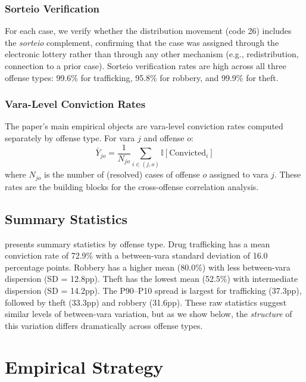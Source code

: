 \documentclass[12pt]{article}
\newcommand{\ind}{\mathbb{I}}
\begin{document}
\subsubsection*{Sorteio Verification} For each case, we verify whether the distribution movement (code 26) includes the \textit{sorteio} complement, confirming that the case was assigned through the electronic lottery rather than through any other mechanism (e.g., redistribution, connection to a prior case). Sorteio verification rates are high across all three offense types: 99.6\% for trafficking, 95.8\% for robbery, and 99.9\% for theft.

\subsubsection*{Vara-Level Conviction Rates} The paper's main empirical objects are vara-level conviction rates computed separately by offense type. For vara $j$ and offense $o$:
\begin{equation}
\bar{Y}_{jo} = \frac{1}{N_{jo}} \sum_{i \in (j,o)} \ind[\text{Convicted}_i]
\end{equation}
where $N_{jo}$ is the number of (resolved) cases of offense $o$ assigned to vara $j$. These rates are the building blocks for the cross-offense correlation analysis.

\subsection{Summary Statistics}



 presents summary statistics by offense type. Drug trafficking has a mean conviction rate of 72.9\% with a between-vara standard deviation of 16.0 percentage points. Robbery has a higher mean (80.0\%) with less between-vara dispersion (SD = 12.8pp). Theft has the lowest mean (52.5\%) with intermediate dispersion (SD = 14.2pp). The P90--P10 spread is largest for trafficking (37.3pp), followed by theft (33.3pp) and robbery (31.6pp). These raw statistics suggest similar levels of between-vara variation, but as we show below, the \textit{structure} of this variation differs dramatically across offense types.


\section{Empirical Strategy}
\end{document}
